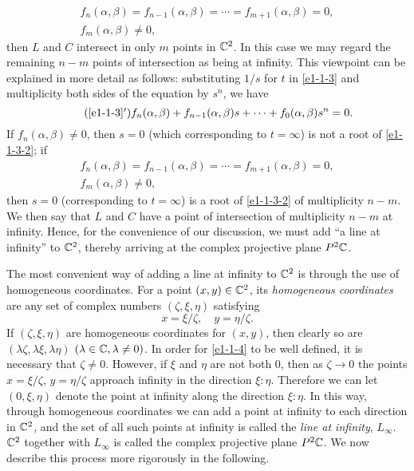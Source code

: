 \begin{gather*}
    f_n(\alpha,\beta)=f_{n-1}(\alpha,\beta)=\cdots=f_{m+1}(\alpha,\beta)=0, \\
    f_m(\alpha,\beta)\neq0, 
\end{gather*}
then $L$ and $C$ intersect in only $m$ points in $\mathbb{C}^2$. In this case we may regard the remaining $n-m$ points of intersection as being at infinity. This viewpoint can be explained in more detail as follows: substituting $1/s$ for $t$ in \eqref{e1-1-3} and multiplicity both sides of the equation by $s^n$, we have 
\begin{equation}\label{e1-1-3-2}\tag{\ref*{e1-1-3}$'$}
    f_n(\alpha,\beta)+f_{n-1}(\alpha,\beta)s+\cdots+f_0(\alpha,\beta)s^n=0. 
\end{equation}
If $f_n(\alpha,\beta)\neq0$, then $s=0$ (which corresponding to $t=\infty$) is not a root of \eqref{e1-1-3-2}; if 
\begin{gather*}
    f_n(\alpha,\beta)=f_{n-1}(\alpha,\beta)=\cdots=f_{m+1}(\alpha,\beta)=0, \\
    f_m(\alpha,\beta)\neq0, 
\end{gather*}
then $s=0$ (corresponding to $t=\infty$) is a root of \eqref{e1-1-3-2} of multiplicity $n-m$. We then say that $L$ and $C$ have a point of intersection of multiplicity $n-m$ at infinity. Hence, for the convenience of our discussion, we must add ``a line at infinity'' to $\mathbb{C}^2$, thereby arriving at the complex projective plane $P^2\mathbb{C}$. 

The most convenient way of adding a line at infinity to $\mathbb{C}^2$ is through the use of homogeneous coordinates. For a point $(x,y)\in\mathbb{C}^2$, its \textit{homogeneous coordinates} are any set of complex numbers $(\zeta,\xi,\eta)$ satisfying 
\begin{equation}\label{e1-1-4}
    x=\xi/\zeta, \quad y=\eta/\zeta. 
\end{equation}
If $(\zeta,\xi,\eta)$ are homogeneous coordinates for $(x,y)$, then clearly so are $(\lambda\zeta,\lambda\xi,\lambda\eta)$ $(\lambda\in\mathbb{C},\lambda\neq0)$. In order for \eqref{e1-1-4} to be well defined, it is necessary that $\zeta\neq0$. However, if $\xi$ and $\eta$ are not both $0$, then as $\zeta\to0$ the points $x=\xi/\zeta$, $y=\eta/\zeta$ approach infinity in the direction $\xi:\eta$. Therefore we can let $(0,\xi,\eta)$ denote the point at infinity along the direction $\xi:\eta$. In this way, through homogeneous coordinates we can add a point at infinity to each direction in $\mathbb{C}^2$, and the set of all such points at infinity is called the \textit{line at infinity}, $L_\infty$. $\mathbb{C}^2$ together with $L_\infty$ is called the complex projective plane $P^2\mathbb{C}$. We now describe this process more rigorously in the following. 

